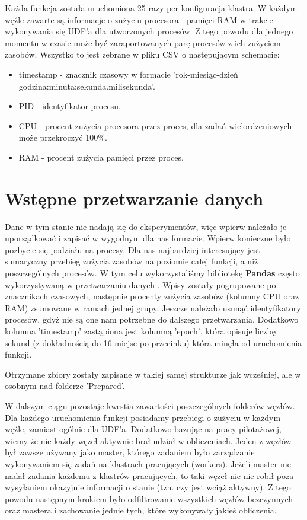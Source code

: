 Każda funkcja została uruchomiona 25 razy per konfiguracja klastra. W każdym węźle zawarte są informacje o zużyciu procesora i pamięci RAM w trakcie wykonywania się UDF'a dla utworzonych procesów. Z tego powodu dla jednego momentu w czasie może być zaraportowanych parę procesów z ich zużyciem zasobów. Wszystko to jest zebrane w pliku CSV o następującym schemacie:
\begin{itemize}
    \item timestamp - znacznik czasowy w formacie 'rok-miesiąc-dzień godzina:minuta:sekunda.milisekunda'.
    \item PID - identyfikator procesu.
    \item CPU - procent zużycia procesora przez proces, dla zadań wielordzeniowych może przekroczyć 100\%.
    \item RAM - procent zużycia pamięci przez proces.
\end{itemize}
\section{Wstępne przetwarzanie danych}
Dane w tym stanie nie nadają się do eksperymentów, więc wpierw należało je uporządkować i zapisać w wygodnym dla nas formacie. Wpierw konieczne było pozbycie się podziału na procesy. Dla nas najbardziej interesujący jest sumaryczny przebieg zużycia zasobów na poziomie całej funkcji, a niż poszczególnych procesów. W tym celu wykorzystaliśmy bibliotekę \textbf{Pandas} \cite{reback2020pandas} często wykorzystywaną w przetwarzaniu danych \cite{reback2020pandas}. Wpisy zostały pogrupowane po znacznikach czasowych, następnie procenty zużycia zasobów (kolumny CPU oraz RAM) zsumowane w ramach jednej grupy. Jeszcze należało usunąć identyfikatory procesów, gdyż nie są one nam potrzebne do dalszego przetwarzania. Dodatkowo kolumna 'timestamp' zastąpiona jest kolumną 'epoch', która opisuje liczbę sekund (z dokładnością do 16 miejsc po przecinku) która minęła od uruchomienia funkcji.

Otrzymane zbiory zostały zapisane w takiej samej strukturze jak wcześniej, ale w osobnym nad-folderze 'Prepared'.

W dalszym ciągu pozostaje kwestia zawartości poszczególnych folderów węzłów. Dla każdego uruchomienia funkcji posiadamy przebiegi o zużyciu w każdym węźle, zamiast ogólnie dla UDF'a. Dodatkowo bazując na pracy pilotażowej, wiemy że nie każdy węzeł aktywnie brał udział w obliczeniach. Jeden z węzłów był zawsze używany jako master, którego zadaniem było zarządzanie wykonywaniem się zadań na klastrach pracujących (workers). Jeżeli master nie nadał zadania każdemu z klastrów pracujących, to taki węzeł nic nie robił poza wysyłaniem okazyjnie informacji o stanie (tzn. czy jest wciąż aktywny). Z tego powodu następnym krokiem było odfiltrowanie wszystkich węzłów bezczynnych oraz mastera i zachowanie jednie tych, które wykonywały jakieś obliczenia.

